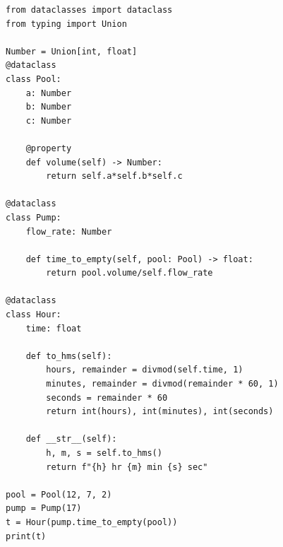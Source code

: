 \begin{verbatim}
from dataclasses import dataclass
from typing import Union

Number = Union[int, float]
@dataclass
class Pool:
	a: Number
	b: Number
	c: Number
	
	@property
	def volume(self) -> Number:
		return self.a*self.b*self.c
		
@dataclass
class Pump:
	flow_rate: Number
	
	def time_to_empty(self, pool: Pool) -> float:
		return pool.volume/self.flow_rate

@dataclass
class Hour:
    time: float   

    def to_hms(self):
        hours, remainder = divmod(self.time, 1)
        minutes, remainder = divmod(remainder * 60, 1)
        seconds = remainder * 60
        return int(hours), int(minutes), int(seconds)

    def __str__(self):
        h, m, s = self.to_hms()
        return f"{h} hr {m} min {s} sec"

pool = Pool(12, 7, 2)
pump = Pump(17)
t = Hour(pump.time_to_empty(pool))
print(t)
\end{verbatim}